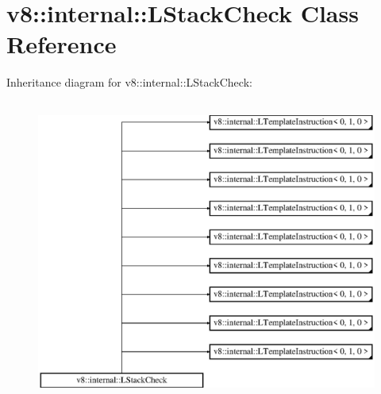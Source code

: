 \hypertarget{classv8_1_1internal_1_1_l_stack_check}{}\section{v8\+:\+:internal\+:\+:L\+Stack\+Check Class Reference}
\label{classv8_1_1internal_1_1_l_stack_check}
Inheritance diagram for v8\+:\+:internal\+:\+:L\+Stack\+Check\+:\begin{figure}[H]
\begin{center}
\leavevmode
\includegraphics[height=10.000000cm]{classv8_1_1internal_1_1_l_stack_check}
\end{center}
\end{figure}
